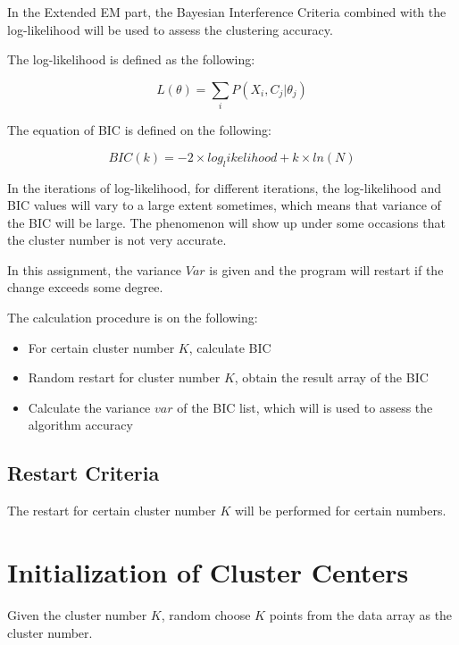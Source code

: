 \documentclass[11pt, a4paper]{article}
\begin{document}
In the Extended EM part, the Bayesian Interference Criteria combined with the log-likelihood will be used to assess the clustering accuracy.

The log-likelihood is defined as the following:

\begin{equation}
	L(\theta) = \sum_i P(X_i,C_j|\theta_j)
\end{equation}

The equation of BIC is defined on the following:

\begin{equation}
BIC(k) = -2\times log_likelihood + k\times ln(N)
\end{equation}

In the iterations of log-likelihood, for different iterations, the log-likelihood and BIC values will vary to a large extent sometimes, which means that variance of the BIC will be large. The phenomenon will show up under some occasions that the cluster number is not very accurate. 

In this assignment, the variance $Var$ is given and the program will restart if the change exceeds some degree.

The calculation procedure is on the following:

\begin{itemize}
\item For certain cluster number $K$, calculate BIC
\item Random restart for cluster number $K$, obtain the result array of the BIC 
\item Calculate the variance $var$ of the BIC list, which will is used to assess the algorithm accuracy
\end{itemize}

\subsection{Restart Criteria}

The restart for certain cluster number $K$ will be performed for certain numbers.




\section{Initialization of Cluster Centers}

Given the cluster number $K$, random choose $K$ points from the data array as the cluster number.
\end{document}

